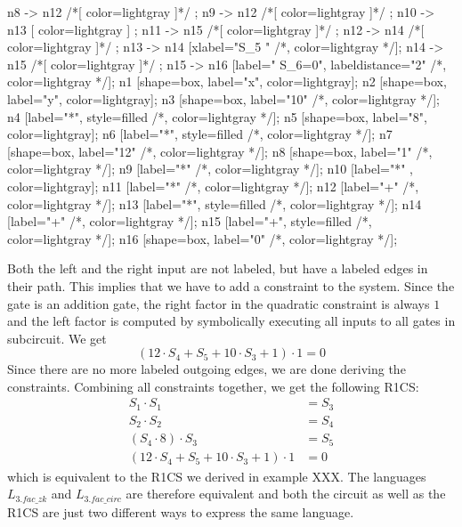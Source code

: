 \begin{example}
\begin{center}
{	n8 -> n12 /*[ color=lightgray ]*/ ;
	n9 -> n12 /*[ color=lightgray ]*/ ;
	n10 -> n13 [ color=lightgray ] ; 
	n11 -> n15 /*[ color=lightgray ]*/ ;
	n12 -> n14 /*[ color=lightgray ]*/ ;	
	n13 -> n14 [xlabel="S_5  "  /*, color=lightgray */];
	n14 -> n15 /*[ color=lightgray ]*/ ;
	n15 -> n16 [label="  S_6=0", labeldistance="2" /*, color=lightgray */];
	n1 [shape=box, label="x", color=lightgray];
	n2 [shape=box, label="y", color=lightgray];
	n3 [shape=box, label="10" /*, color=lightgray */];
	n4 [label="*", style=filled /*, color=lightgray */];
	n5 [shape=box, label="8", color=lightgray];
	n6 [label="*", style=filled /*, color=lightgray */];
	n7 [shape=box, label="12" /*, color=lightgray */];
	n8 [shape=box, label="1" /*, color=lightgray */];
	n9 [label="*" /*, color=lightgray */];
	n10 [label="*" , color=lightgray];
	n11 [label="*" /*, color=lightgray */];	
	n12 [label="+" /*, color=lightgray */];	
	n13 [label="*", style=filled /*, color=lightgray */];
	n14 [label="+" /*, color=lightgray */];
	n15 [label="+", style=filled /*, color=lightgray */];
	n16 [shape=box, label="0" /*, color=lightgray */];		
}
\end{center}
Both the left and the right input are not labeled, but have a labeled edges in their path. This implies that we have to add a constraint to the system. Since the gate is an addition gate, the right factor in the quadratic constraint is always $1$ and the left factor is computed by symbolically executing all inputs to all gates in subcircuit. We get
$$
(12\cdot S_4 + S_5 + 10\cdot S_3 + 1)\cdot 1 = 0
$$
Since there are no more labeled outgoing edges, we are done deriving the constraints. Combining all constraints together, we get the following R1CS:
\begin{align*}
 S_1 \cdot S_1 &= S_3\\
 S_2 \cdot S_2 &= S_4\\
 (S_4\cdot 8)\cdot S_3 &= S_5\\
 (12\cdot S_4 + S_5 + 10\cdot S_3 + 1)\cdot 1 &= 0
\end{align*}
which is equivalent to the R1CS we derived in example XXX. The languages $L_{3.fac\_zk}$ and $L_{3.fac\_circ}$ are therefore equivalent and both the circuit as well as the R1CS are just two different ways to express the same language.
\end{example}
